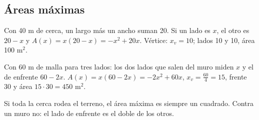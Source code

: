 \subsection{Áreas máximas}
\begin{ejemplo} Con 40 m de cerca, un largo más un ancho suman 20. Si un lado es $x$, el otro es $20 - x$ y $A(x) = x(20 - x) = -x^2 + 20x$. Vértice: $x_v = 10$; lados 10 y 10, área 100 m$^2$.\end{ejemplo}
\par\noindent\begin{minipage}{0.6\linewidth}
\begin{ejemplo} Con 60 m de malla para tres lados: los dos lados que salen del muro miden $x$ y el de enfrente $60 - 2x$. $A(x) = x(60 - 2x) = -2x^2 + 60x$, $x_v = \frac{60}{4} = 15$, frente $30$ y área $15\cdot 30 = 450$ m$^2$.\end{ejemplo}
\end{minipage}\hfill
\begin{minipage}{0.36\linewidth}\centering
{}
\end{minipage}
\begin{ojo} Si toda la cerca rodea el terreno, el área máxima es siempre un cuadrado. Contra un muro no: el lado de enfrente es el doble de los otros.\end{ojo}

